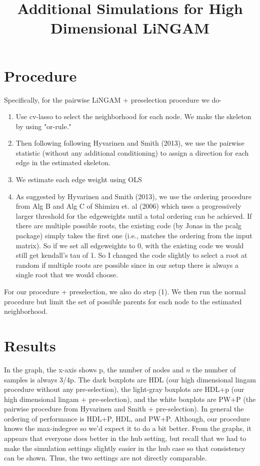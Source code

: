 \documentclass{article}\usepackage[]{graphicx}\usepackage[]{color}
\title{Additional Simulations for High Dimensional LiNGAM}
\author{}
\begin{document}
\maketitle

\section{Procedure}
Specifically, for the pairwise LiNGAM + preselection procedure we do-

\begin{enumerate}
\item Use cv-lasso to select the neighborhood for each node. We make the skeleton by using "or-rule."
\item Then following following Hyvarinen and Smith (2013), we use the pairwise statistic (without any additional conditioning) to assign a direction for each edge in the estimated skeleton.
\item  We estimate each edge weight using OLS
\item As suggested by Hyvarinen and Smith (2013), we use the ordering procedure from Alg B and Alg C of Shimizu et. al (2006) which uses a progressively larger threshold for the edgeweights until a total ordering can be achieved. If there are multiple possible roots, the existing code (by Jonas in the pcalg package) simply takes the first one (i.e., matches the ordering from the input matrix). So if we set all edgeweights to 0, with the existing code we would still get kendall's tau of 1. So I changed the code slightly to select a root at random if multiple roots are possible since in our setup there is always a single root that we would choose.
\end{enumerate}

For our procedure + preselection, we also do step (1). We then run the normal procedure but limit the set of possible parents for each node to the estimated neighborhood. 

\FloatBarrier

\section{Results}

In the graph, the x-axis shows p, the number of nodes and $n$ the number of samples is always 3/4p. The dark boxplots are HDL (our high dimensional lingam procedure without any pre-selection), the light-gray boxplots are HDL+p (our high dimensional lingam + pre-selection), and the white boxplots are PW+P (the pairwise procedure from Hyvarinen and Smith + pre-selection). In general the ordering of performance is HDL+P, HDL, and PW+P. Although, our procedure knows the max-indegree so we'd expect it to do a bit better. From the graphs, it appears that everyone does better in the hub setting, but recall that we had to make the simulation settings slightly easier in the hub case so that consistency can be shown. Thus, the two settings are not directly comparable.
\end{document}
